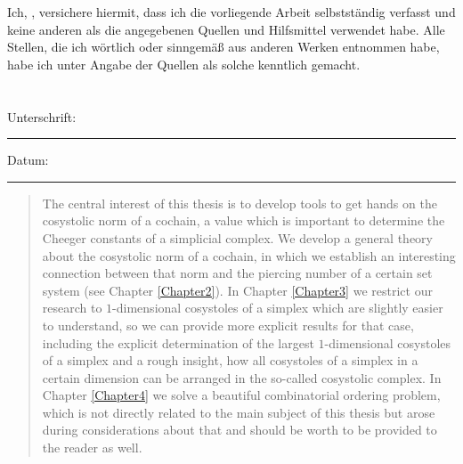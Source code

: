 \documentclass[11pt,english,onehalfspacing,headsepline]{MastersDoctoralThesis}
\begin{document}

\begin{declaration}
\addchaptertocentry{\authorshipname} %
\noindent Ich, \authorname, versichere hiermit, dass ich die vorliegende Arbeit selbstständig verfasst und keine anderen als die angegebenen Quellen und Hilfsmittel verwendet habe. Alle Stellen, die ich wörtlich oder sinngemäß aus anderen Werken entnommen habe, habe ich unter Angabe der Quellen als solche kenntlich gemacht.\\ \\ \\
 
\noindent Unterschrift:\\
\rule[0.5em]{25em}{0.5pt} %
 
\noindent Datum:\\
\rule[0.5em]{25em}{0.5pt} %
\end{declaration}

\cleardoublepage


\begin{abstract}
\addchaptertocentry{\abstractname} %
The central interest of this thesis is to develop tools to get hands on the cosystolic norm of a cochain, a value which is important to determine the Cheeger constants of a simplicial complex. We develop a general theory about the cosystolic norm of a cochain, in which we establish an interesting connection between that norm and the piercing number of a certain set system (see Chapter \ref{Chapter2}). In Chapter \ref{Chapter3} we restrict our research to \(1\)-dimensional cosystoles of a simplex which are slightly easier to understand, so we can provide more explicit results for that case, including the explicit determination of the largest \(1\)-dimensional cosystoles of a simplex and a rough insight, how all cosystoles of a simplex in a certain dimension can be arranged in the so-called cosystolic complex. In Chapter \ref{Chapter4} we solve a beautiful combinatorial ordering problem, which is not directly related to the main subject of this thesis but arose during considerations about that and should be worth to be provided to the reader as well.
\end{abstract}
\end{document}
